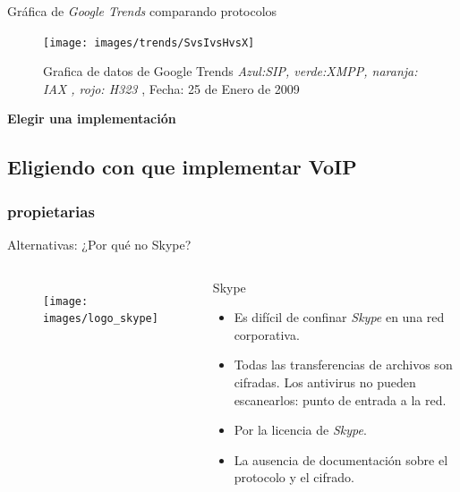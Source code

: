 \documentclass{beamer}
\begin{document}
\begin{frame}{Gráfica de \emph{Google Trends} comparando protocolos}
  \begin{figure}
    \centering
    \texttt{[image: images/trends/SvsIvsHvsX]}
    \caption{Grafica de datos de Google Trends \emph{Azul:SIP, verde:XMPP, naranja: IAX , rojo: H323} , Fecha: 25 de Enero de 2009}
    \end{figure}
\end{frame}


\begin{frame}
  \begin{center}
    \huge{\textbf{Elegir una implementación}}
  \end{center}
\end{frame}

\subsection{Eligiendo con que implementar VoIP}
\label{sec:propietarias}

\subsubsection{propietarias}
\label{sec:propietarias-1}


\begin{frame}{Alternativas: ¿Por qué no Skype?}
  \begin{columns}
    
  \begin{figure}[bt]
      \centering
      \texttt{[image: images/logo\_skype]}
    \end{figure}
  \begin{block}{Skype}
    
    \begin{itemize}[<+-| alert@+>]
    \item Es difícil de confinar \emph{Skype} en una red corporativa.
    \item Todas las transferencias de archivos son cifradas. Los antivirus no pueden escanearlos: punto de entrada a la red.
    \item Por la licencia de \emph{Skype}.
    \item La ausencia de documentación sobre el protocolo y el cifrado.
    \end{itemize}
\end{block}
\end{columns}
\end{frame}
\end{document}
